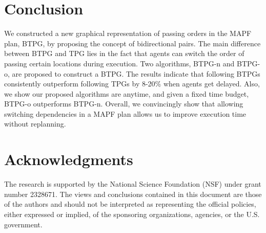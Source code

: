 \documentclass[letterpaper]{article} %
\theoremstyle{definition}
\begin{document}


\section{Conclusion}
We constructed a new graphical representation of passing orders in the MAPF plan, BTPG, by proposing the concept of bidirectional pairs. The main difference between BTPG and TPG lies in the fact that agents can switch the order of passing certain locations during execution. Two algorithms, BTPG-n and BTPG-o, are proposed to construct a BTPG. The results indicate that following BTPGs consistently outperform following TPGs by 8-20\% when agents get delayed. Also, we show our proposed algorithms are anytime, and given a fixed time budget, BTPG-o outperforms BTPG-n. Overall, we convincingly show that allowing switching dependencies in a MAPF plan allows us to improve execution time without replanning. 

\newpage
\section*{Acknowledgments}
The research is supported by the National Science Foundation (NSF) under grant number 2328671. The views and conclusions contained in this document are those of the authors and should not be interpreted as representing the official policies, either expressed or implied, of the sponsoring organizations, agencies, or the U.S. government.
\end{document}
